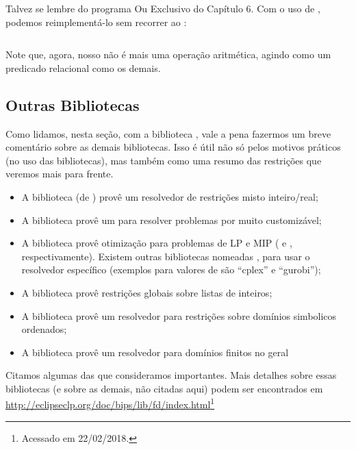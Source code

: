 \documentclass{article}
\begin{document}
Talvez se lembre do programa Ou Exclusivo do Capítulo 6. Com o uso de , podemos reimplementá-lo sem recorrer ao :
\vspace{3cm}

\inputminted{prolog}{../Exemplos/Cap8/prog7_xor.pl}

Note que, agora, nosso  não é mais uma operação aritmética, agindo como um predicado relacional como os demais.

\subsection{Outras Bibliotecas}

Como lidamos, nesta seção, com a biblioteca , vale a pena fazermos um breve
comentário sobre as demais bibliotecas. Isso é útil não só pelos motivos práticos (no uso das
bibliotecas), mas também como uma resumo das restrições que veremos mais para frente.

\begin{itemize}
  \item A biblioteca  (de ) provê um resolvedor de restrições misto inteiro/real;
  \item A biblioteca  provê um  para resolver
    problemas por   muito customizável;
  \item A biblioteca  provê otimização para problemas de LP e MIP ( e , respectivamente). Existem outras bibliotecas
  nomeadas , para usar o resolvedor  específico (exemplos para
  valores de  são ``cplex'' e ``gurobi'');
  \item A biblioteca  provê restrições globais sobre listas de inteiros;
  \item A biblioteca  provê um resolvedor para restrições sobre domínios
    simbolicos ordenados;
  \item A biblioteca  provê um resolvedor para domínios finitos no geral
\end{itemize}

Citamos algumas das que consideramos importantes. Mais detalhes sobre essas bibliotecas (e sobre as
demais, não citadas aqui) podem ser encontrados em
\url{http://eclipseclp.org/doc/bips/lib/fd/index.html}\footnote{Acessado em 22/02/2018.}
\end{document}
